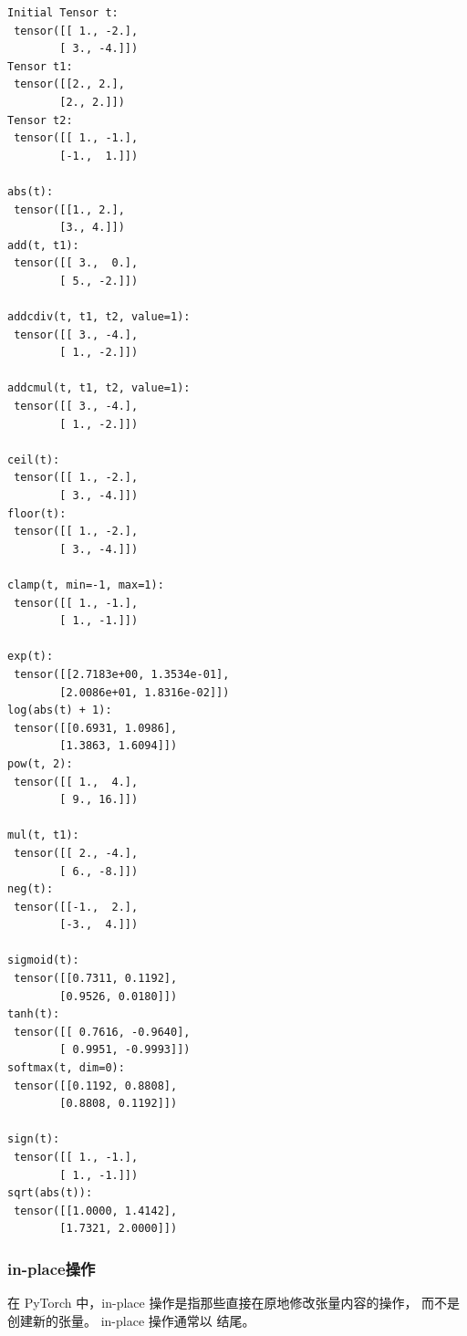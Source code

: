 \begin{lstlisting}[style=demostyle,numbers=none]
Initial Tensor t:
 tensor([[ 1., -2.],
        [ 3., -4.]])
Tensor t1:
 tensor([[2., 2.],
        [2., 2.]])
Tensor t2:
 tensor([[ 1., -1.],
        [-1.,  1.]])

abs(t):
 tensor([[1., 2.],
        [3., 4.]])
add(t, t1):
 tensor([[ 3.,  0.],
        [ 5., -2.]])

addcdiv(t, t1, t2, value=1):
 tensor([[ 3., -4.],
        [ 1., -2.]])

addcmul(t, t1, t2, value=1):
 tensor([[ 3., -4.],
        [ 1., -2.]])

ceil(t):
 tensor([[ 1., -2.],
        [ 3., -4.]])
floor(t):
 tensor([[ 1., -2.],
        [ 3., -4.]])

clamp(t, min=-1, max=1):
 tensor([[ 1., -1.],
        [ 1., -1.]])

exp(t):
 tensor([[2.7183e+00, 1.3534e-01],
        [2.0086e+01, 1.8316e-02]])
log(abs(t) + 1):
 tensor([[0.6931, 1.0986],
        [1.3863, 1.6094]])
pow(t, 2):
 tensor([[ 1.,  4.],
        [ 9., 16.]])

mul(t, t1):
 tensor([[ 2., -4.],
        [ 6., -8.]])
neg(t):
 tensor([[-1.,  2.],
        [-3.,  4.]])

sigmoid(t):
 tensor([[0.7311, 0.1192],
        [0.9526, 0.0180]])
tanh(t):
 tensor([[ 0.7616, -0.9640],
        [ 0.9951, -0.9993]])
softmax(t, dim=0):
 tensor([[0.1192, 0.8808],
        [0.8808, 0.1192]])

sign(t):
 tensor([[ 1., -1.],
        [ 1., -1.]])
sqrt(abs(t)):
 tensor([[1.0000, 1.4142],
        [1.7321, 2.0000]])
\end{lstlisting}
\subsubsection{in-place操作}
\label{subsec:Pytorch的in-place操作}
在 PyTorch 中，in-place 操作是指那些直接在原地修改张量内容的操作，
而不是创建新的张量。
in-place 操作通常以 \codeinline{\_} 结尾。

